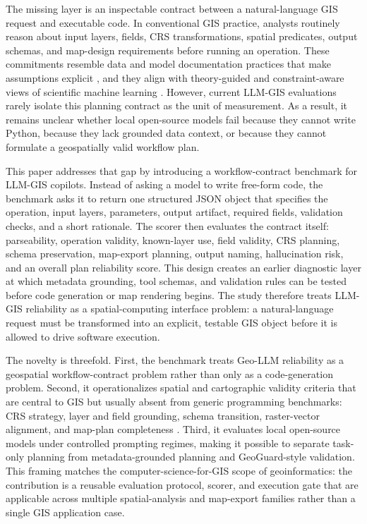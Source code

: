\documentclass[12pt]{gsis}  %
\begin{document}
The missing layer is an inspectable contract between a natural-language GIS request and executable code. In conventional GIS practice, analysts routinely reason about input layers, fields, CRS transformations, spatial predicates, output schemas, and map-design requirements before running an operation. These commitments resemble data and model documentation practices that make assumptions explicit \citep{Gebru2021Datasheets,Mitchell2019ModelCards}, and they align with theory-guided and constraint-aware views of scientific machine learning \citep{Karpatne_2017}. However, current LLM-GIS evaluations rarely isolate this planning contract as the unit of measurement. As a result, it remains unclear whether local open-source models fail because they cannot write Python, because they lack grounded data context, or because they cannot formulate a geospatially valid workflow plan.

This paper addresses that gap by introducing a workflow-contract benchmark for LLM-GIS copilots. Instead of asking a model to write free-form code, the benchmark asks it to return one structured JSON object that specifies the operation, input layers, parameters, output artifact, required fields, validation checks, and a short rationale. The scorer then evaluates the contract itself: parseability, operation validity, known-layer use, field validity, CRS planning, schema preservation, map-export planning, output naming, hallucination risk, and an overall plan reliability score. This design creates an earlier diagnostic layer at which metadata grounding, tool schemas, and validation rules can be tested before code generation or map rendering begins. The study therefore treats LLM-GIS reliability as a spatial-computing interface problem: a natural-language request must be transformed into an explicit, testable GIS object before it is allowed to drive software execution.

The novelty is threefold. First, the benchmark treats Geo-LLM reliability as a geospatial workflow-contract problem rather than only as a code-generation problem. Second, it operationalizes spatial and cartographic validity criteria that are central to GIS but usually absent from generic programming benchmarks: CRS strategy, layer and field grounding, schema transition, raster-vector alignment, and map-plan completeness \citep{Roth_2013,Roth_2015,Kang_2024,Munzner_2009}. Third, it evaluates local open-source models under controlled prompting regimes, making it possible to separate task-only planning from metadata-grounded planning and GeoGuard-style validation. This framing matches the computer-science-for-GIS scope of geoinformatics: the contribution is a reusable evaluation protocol, scorer, and execution gate that are applicable across multiple spatial-analysis and map-export families rather than a single GIS application case.
\end{document}
